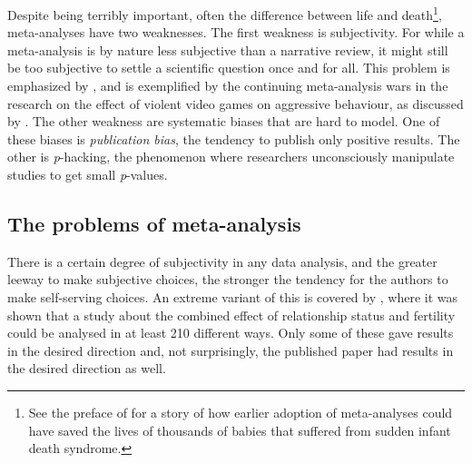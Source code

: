 Despite being terribly important, often the difference between life and death\footnote{See the preface of \textcite{Borenstein2011-yx} for a story of how earlier adoption of meta-analyses could have saved the lives of thousands of babies that suffered from sudden infant death syndrome.}, meta-analyses have two weaknesses. The first weakness is subjectivity. For while a meta-analysis is by nature less subjective than a narrative review, it might still be too subjective to settle a scientific question once and for all. This problem is emphasized by \textcite{Stegenga2011-zo}, and is exemplified by the continuing meta-analysis wars in the research on the effect of violent video games on aggressive behaviour, as discussed by \textcite{elson_twenty-five_2014}. The other weakness are systematic biases that are hard to model. One of these biases is \emph{publication
bias}, the tendency to publish only positive results. The other is
\emph{p}-hacking, the phenomenon where researchers unconsciously manipulate studies to get small \emph{p}-values.

\subsection{The problems of meta-analysis}
There is a certain degree of subjectivity in any data analysis, and the greater leeway to make subjective choices, the stronger the  tendency for the authors to make self-serving choices. An extreme variant of this is covered by \textcite{Steegen2016-fj}, where it was shown that a study about the combined effect of relationship status and fertility \parencite{Durante2013-yx} could be analysed in at least 210 different ways. Only some of these gave results in the desired direction and, not surprisingly, the published paper had results in the desired direction as well. 

